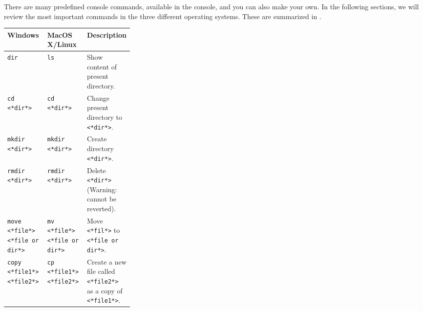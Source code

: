 \documentclass[fsharpnotes.tex]{subfiles}
\begin{document}
There are many predefined console commands, available in the console, and you can also make your own. In the following sections, we will review the most important commands in the three different operating systems. These are summarized in .
\begin{table}
  \centering
  \begin{tabular}{|l|l||p{0.3\linewidth}|}
    \hline
    Windows & MacOS X/Linux & Description 
    \\ \hline\hline
    {\lstinline[language=syntax]|dir|}
            & {\lstinline[language=syntax]|ls|}
                            & Show content of present directory.
    \\ \hline
    {\lstinline[language=syntax]|cd <*dir*>|} 
            &{\lstinline[language=syntax]|cd <*dir*>|} 
                          & Change present directory to {\lstinline[language=syntax]|<*dir*>|}. 
    \\ \hline
    {\lstinline[language=syntax]|mkdir <*dir*>|}
            & {\lstinline[language=syntax]|mkdir <*dir*>|}
                          & Create directory {\lstinline[language=syntax]|<*dir*>|}. \\ \hline
    {\lstinline[language=syntax]|rmdir <*dir*>|}
            & {\lstinline[language=syntax]|rmdir <*dir*>|}
                          & Delete {\lstinline[language=syntax]|<*dir*>|} (Warning: cannot be reverted). \\ \hline
    {\lstinline[language=syntax, keywords={}]|move <*file*> <*file or dir*>|\hspace*{5mm}}%
            &{\lstinline[language=syntax, keywords={}]|mv <*file*> <*file or dir*>|}
                          & Move {\lstinline[language=syntax]|<*fil*>|} to {\lstinline[language=syntax, keywords={}]|<*file or dir*>|}. \\ \hline
    {\lstinline[language=syntax]|copy <*file1*> <*file2*>|}
            &{\lstinline[language=syntax]|cp <*file1*> <*file2*>|}
             & Create a new file called {\lstinline[language=syntax]|<*file2*>|} as a copy of {\lstinline[language=syntax]|<*file1*>|}. \\ \hline

\end{tabular}
\end{table}
\end{document}

